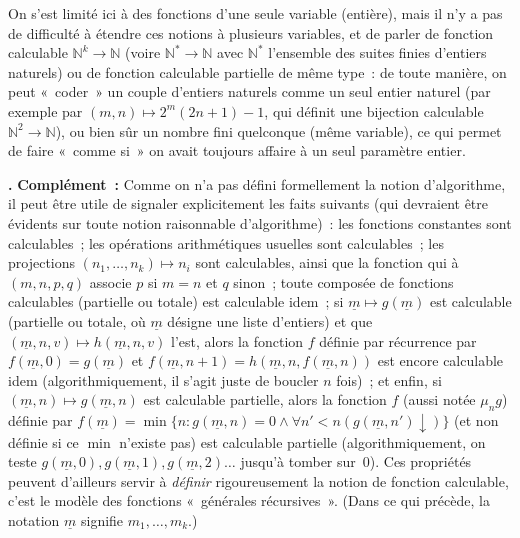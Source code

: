 \documentclass[12pt,a4paper]{article}
\theoremstyle{definition}
\newcommand\thingy{%
\refstepcounter{comcnt}\medskip\noindent\textbf{\thecomcnt.} }
\begin{document}
\smallskip

On s'est limité ici à des fonctions d'une seule variable (entière),
mais il n'y a pas de difficulté à étendre ces notions à plusieurs
variables, et de parler de fonction calculable $\mathbb{N}^k \to
\mathbb{N}$ (voire $\mathbb{N}^* \to \mathbb{N}$ avec $\mathbb{N}^*$
l'ensemble des suites finies d'entiers naturels) ou de fonction
calculable partielle de même type : de toute manière, on peut « coder »
un couple d'entiers naturels comme un seul entier naturel (par exemple
par $(m,n) \mapsto 2^m(2n+1)-1$, qui définit une bijection calculable
$\mathbb{N}^2 \to \mathbb{N}$), ou bien sûr un nombre fini quelconque
(même variable), ce qui permet de faire « comme si » on avait toujours
affaire à un seul paramètre entier.

{\footnotesize\thingy\textbf{Complément :} Comme on n'a pas défini
  formellement la notion d'algorithme, il peut être utile de signaler
  explicitement les faits suivants (qui devraient être évidents sur
  toute notion raisonnable d'algorithme) : les fonctions constantes
  sont calculables ; les opérations arithmétiques usuelles sont
  calculables ; les projections $(n_1,\ldots,n_k) \mapsto n_i$ sont
  calculables, ainsi que la fonction qui à $(m,n,p,q)$ associe $p$ si
  $m=n$ et $q$ sinon ; toute composée de fonctions calculables
  (partielle ou totale) est calculable idem ; si $\underline{m}
  \mapsto g(\underline{m})$ est calculable (partielle ou totale,
  où $\underline{m}$ désigne une liste d'entiers) et
  que $(\underline{m}, n, v) \mapsto h(\underline{m}, n, v)$ l'est,
  alors la fonction $f$ définie par récurrence par $f(\underline{m},0)
  = g(\underline{m})$ et $f(\underline{m},n+1) = h(\underline{m}, n,
  f(\underline{m},n))$ est encore calculable idem (algorithmiquement,
  il s'agit juste de boucler $n$ fois) ; et enfin, si $(\underline{m},
  n) \mapsto g(\underline{m},n)$ est calculable partielle, alors la
  fonction $f$ (aussi notée $\mu_n g$) définie par $f(\underline{m}) =
  \min\{n : g(\underline{m},n) = 0 \land \forall n'<n
  (g(\underline{m},n')\downarrow)\}$ (et non définie si ce $\min$
  n'existe pas) est calculable partielle (algorithmiquement, on teste
  $g(\underline{m},0),g(\underline{m},1),g(\underline{m},2)\ldots$
  jusqu'à tomber sur $0$).  Ces propriétés peuvent d'ailleurs servir à
  \emph{définir} rigoureusement la notion de fonction calculable,
  c'est le modèle des fonctions « générales récursives ».  (Dans ce
  qui précède, la notation $\underline{m}$ signifie
  $m_1,\ldots,m_k$.)\par}
\end{document}

